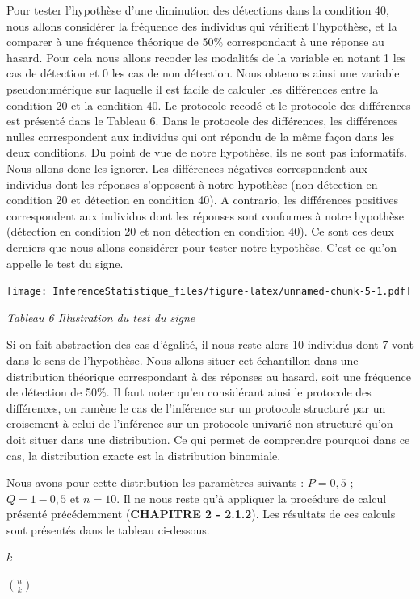 \documentclass[]{book}
\theoremstyle{definition}
\theoremstyle{definition}
\theoremstyle{definition}
\theoremstyle{remark}
\begin{document}
Pour tester l'hypothèse d'une diminution des détections dans la
condition 40, nous allons considérer la fréquence des individus qui
vérifient l'hypothèse, et la comparer à une fréquence théorique de 50\%
correspondant à une réponse au hasard. Pour cela nous allons recoder les
modalités de la variable en notant 1 les cas de détection et 0 les cas
de non détection. Nous obtenons ainsi une variable pseudonumérique sur
laquelle il est facile de calculer les différences entre la condition 20
et la condition 40. Le protocole recodé et le protocole des différences
est présenté dans le Tableau 6. Dans le protocole des différences, les
différences nulles correspondent aux individus qui ont répondu de la
même façon dans les deux conditions. Du point de vue de notre hypothèse,
ils ne sont pas informatifs. Nous allons donc les ignorer. Les
différences négatives correspondent aux individus dont les réponses
s'opposent à notre hypothèse (non détection en condition 20 et détection
en condition 40). A contrario, les différences positives correspondent
aux individus dont les réponses sont conformes à notre hypothèse
(détection en condition 20 et non détection en condition 40). Ce sont
ces deux derniers que nous allons considérer pour tester notre
hypothèse. C'est ce qu'on appelle le test du signe.

\texttt{[image: InferenceStatistique\_files/figure-latex/unnamed-chunk-5-1.pdf]}

\emph{Tableau 6 Illustration du test du signe}

Si on fait abstraction des cas d'égalité, il nous reste alors 10
individus dont 7 vont dans le sens de l'hypothèse. Nous allons situer
cet échantillon dans une distribution théorique correspondant à des
réponses au hasard, soit une fréquence de détection de 50\%. Il faut
noter qu'en considérant ainsi le protocole des différences, on ramène le
cas de l'inférence sur un protocole structuré par un croisement à celui
de l'inférence sur un protocole univarié non structuré qu'on doit situer
dans une distribution. Ce qui permet de comprendre pourquoi dans ce cas,
la distribution exacte est la distribution binomiale.

Nous avons pour cette distribution les paramètres suivants : \(P=0,5\) ;
\(Q=1-0,5\) et \(n=10\). Il ne nous reste qu'à appliquer la procédure de
calcul présenté précédemment (\textbf{CHAPITRE 2 - 2.1.2}). Les
résultats de ces calculs sont présentés dans le tableau ci-dessous.

\(k\)

\(\binom{n}{k}\)
\end{document}
